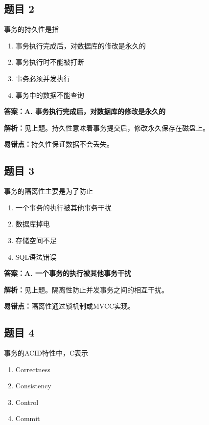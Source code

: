 \documentclass[12pt,a4paper]{ctexart}
\begin{document}
\subsection*{题目 2}
事务的持久性是指
\begin{enumerate}[label=\Alph*.]
	\item 事务执行完成后，对数据库的修改是永久的
	\item 事务执行时不能被打断
	\item 事务必须并发执行
	\item 事务中的数据不能查询
\end{enumerate}

\begin{answerbox}
	\textbf{答案：A. 事务执行完成后，对数据库的修改是永久的}

	\textbf{解析：}见上题。持久性意味着事务提交后，修改永久保存在磁盘上。

	\textbf{易错点：}持久性保证数据不会丢失。
\end{answerbox}

\subsection*{题目 3}
事务的隔离性主要是为了防止
\begin{enumerate}[label=\Alph*.]
	\item 一个事务的执行被其他事务干扰
	\item 数据库掉电
	\item 存储空间不足
	\item SQL语法错误
\end{enumerate}

\begin{answerbox}
	\textbf{答案：A. 一个事务的执行被其他事务干扰}

	\textbf{解析：}见上题。隔离性防止并发事务之间的相互干扰。

	\textbf{易错点：}隔离性通过锁机制或MVCC实现。
\end{answerbox}

\subsection*{题目 4}
事务的ACID特性中，C表示
\begin{enumerate}[label=\Alph*.]
	\item Correctness
	\item Consistency
	\item Control
	\item Commit
\end{enumerate}
\end{document}
